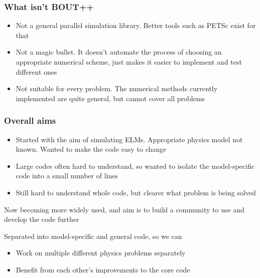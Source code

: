 \documentclass{beamer}
\begin{document}
\begin{frame}
  \frametitle{What {\bf isn't} BOUT++}
  
  \begin{itemize}
  \item Not a general parallel simulation library. Better tools such as PETSc
    exist for that
  \item Not a magic bullet. It doesn't automate the process of choosing an appropriate numerical scheme, just makes it easier to implement and test different ones
  \item Not suitable for every problem. The numerical methods currently implemented are quite general, but cannot cover all problems
  \end{itemize}
\end{frame}

\begin{frame}
  \frametitle{Overall aims}
  
  \begin{itemize}
  \item Started with the aim of simulating ELMs. Appropriate physics model
    not known. Wanted to make the code easy to change
  \item Large codes often hard to understand, so wanted to isolate the
    model-specific code into a small number of lines
  \item Still hard to understand whole code, but clearer what problem is being solved
  \end{itemize}

  \pause
  
  Now becoming more widely used, and aim is to build a 
  community to use and develop the code further
  
  Separated into model-specific and general code, so we can
  \begin{itemize}
  \item  Work on multiple different physics problems separately
  \item  Benefit from each other's improvements to the core code
  \end{itemize}
\end{frame}
\end{document}
